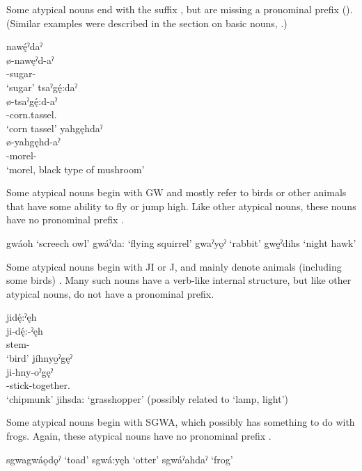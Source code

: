 Some atypical nouns end with the  {\nsf} suffix , but are missing a pronominal prefix (\noprefix). (Similar examples were described in the section on basic nouns, .)

\ea\label{ex:atypn3}
\ea nawę́ˀdaˀ\\
\gll ø-nawęˀd-aˀ\\
 {\noprefix}-sugar-{\nounstemformer}\\
\glt `sugar'
\ex tsaˀgę́:daˀ\\
\gll ø-tsaˀgę́:d-aˀ\\
 {\noprefix}-corn.tassel.{\nounstemformer}\\
\glt `corn tassel'
\ex yahgęhdaˀ\\
\gll ø-yahgęhd-aˀ\\
 {\noprefix}-morel-{\nounstemformer}\\
\glt `morel, black type of mushroom'
\z
\z

Some atypical nouns begin with GW and mostly refer to birds or other animals that have some ability to fly or jump high. Like other atypical nouns, these nouns have no pronominal prefix .

\ea\label{ex:atypn4}
\ea gwáoh ‘screech owl’
\ex gwáˀda: ‘flying squirrel’
\ex gwaˀyǫˀ ‘rabbit’
\ex gwę̱ˀdihs ‘night hawk’
\z
\z

Some atypical nouns begin with JI or J, and mainly denote animals (including some birds) . Many such nouns have a verb-like internal structure, but like other atypical nouns, do not have a pronominal prefix.

\ea\label{ex:atypn5}
\ea jidę́:ˀęh\\
\gll ji-dę́:-ˀęh\\
stem-{\diminutive}\\
\glt ‘bird’ 
\ex jíhnyo̱ˀgęˀ\\
\gll ji-hny-oˀgęˀ\\
 -stick-together.{\stative}\\
\glt `chipmunk'
\ex jihsda: ‘grasshopper’ (possibly related to  ‘lamp, light’)
\z
\z

Some atypical nouns begin with SGWA, which possibly has something to do with frogs. Again, these atypical nouns have no pronominal prefix .

\ea\label{ex:atypn6}
\ea sgwagwáǫdǫˀ ‘toad’
\ex sgwá:yęh ‘otter’ 
\ex sgwáˀahdaˀ ‘frog’ 
\z
\z


